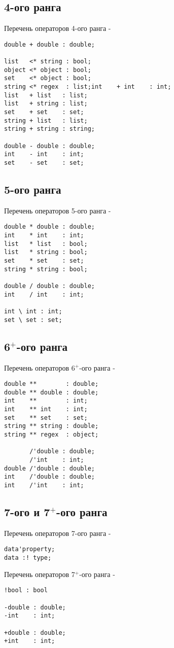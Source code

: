 \subsection{4-ого ранга}

\noindent Перечень операторов 4-ого ранга -
\begin{lstlisting}[numbers=none]
double + double : double;

list   <* string : bool;
object <* object : bool;
set    <* object : bool;
string <* regex  : list;int    + int    : int;
list   + list   : list;
list   + string : list;
set    + set    : set;
string + list   : list;
string + string : string;

double - double : double;
int    - int    : int;
set    - set    : set;
\end{lstlisting}

\subsection{5-ого ранга}

\noindent Перечень операторов 5-ого ранга -
\begin{lstlisting}[numbers=none]
double * double : double;
int    * int    : int;
list   * list   : bool;
list   * string : bool;
set    * set    : set;
string * string : bool;

double / double : double;
int    / int    : int;

int \ int : int;
set \ set : set;
\end{lstlisting}

\subsection{6$^+$-ого ранга}

\noindent Перечень операторов 6$^+$-ого ранга -
\begin{lstlisting}[numbers=none]
double **        : double;
double ** double : double;
int    **        : int;
int    ** int    : int;
set    ** set    : set;
string ** string : double;
string ** regex  : object;

       /'double : double;
       /'int    : int;
double /'double : double;
int    /'double : double;
int    /'int    : int;
\end{lstlisting}

\subsection{7-ого и 7$^+$-ого ранга}

\noindent Перечень операторов 7-ого ранга -
\begin{lstlisting}[numbers=none]
data'property;
data :! type;
\end{lstlisting}

\noindent Перечень операторов 7$^+$-ого ранга -
\begin{lstlisting}[numbers=none]
!bool : bool

-double : double;
-int    : int;

+double : double;
+int    : int;
\end{lstlisting}

